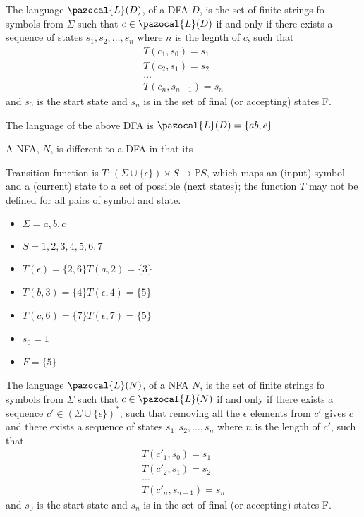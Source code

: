 The language $\pazocal{L}(D)$, of a DFA $D$, is the set of finite strings fo symbols from $\Sigma$ such that $c \in \pazocal{L}(D)$ if and only if there exists a sequence of states $s_1, s_2, \dots, s_n$ where $n$ is the legnth of $c$, such that
\begin{align*}
    T(c_1, s_0) = s_1 \\
    T(c_2, s_1) = s_2 \\
    \dots \\
    T(c_n, s_{n-1}) = s_n
\end{align*}
and $s_0$ is the start state and $s_n$ is in the set of final (or accepting) states F.

The language of the above DFA is $\pazocal{L}(D) = \{ab, c\}$

A NFA, $N$, is different to a DFA in that its 

Transition function is $T : (\Sigma \cup \{ \epsilon \}) \times S \rightarrow \mathbb{P} S$, which maps an (input) symbol and a (current) state to a  set of possible (next states); the function $T$ may not be defined for all pairs of symbol and state.




\begin{itemize}
    \item $\Sigma = {a,b,c}$
    \item $S = {1, 2, 3, 4, 5, 6, 7}$
    \item $T(\epsilon) = \{2,6\}    T(a,2) = \{3\}$
    \item $T(b,3) = \{4\}    T(\epsilon,4) = \{5\}$
    \item $T(c,6) = \{7\}    T(\epsilon,7) = \{5\}$
    \item $s_0 = 1$
    \item $F = \{5\}$
\end{itemize}

The language $\pazocal{L}(N)$, of a NFA $N$, is the set of finite strings fo symbols from $\Sigma$ such that $c \in \pazocal{L}(N)$ if and only if there exists a sequence $c' \in (\Sigma \cup \{\epsilon \})^*$, such that removing all the $\epsilon$ elements from $c'$ gives $c$ and there exists a sequence of states $s_1, s_2, \dots, s_n$ where $n$ is the length of $c'$, such that
\begin{align*}
    T(c'_1, s_0) = s_1 \\
    T(c'_2, s_1) = s_2 \\
    \dots \\
    T(c'_n, s_{n-1}) = s_n
\end{align*}
and $s_0$ is the start state and $s_n$ is in the set of final (or accepting) states F.

